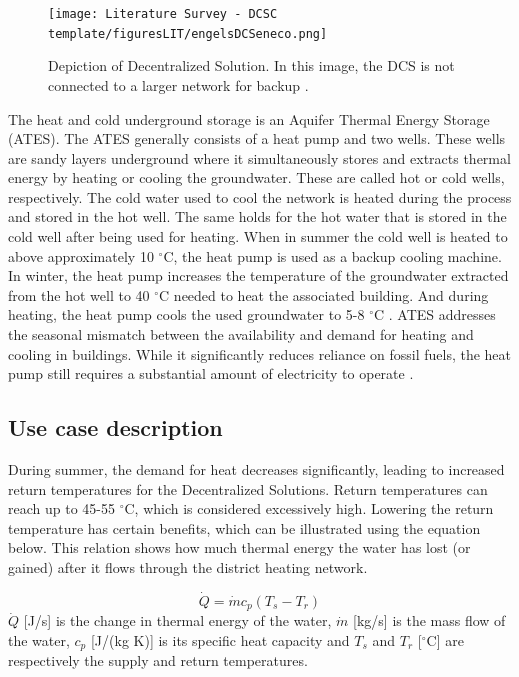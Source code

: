 \begin{figure}[h]
    \centering
    \texttt{[image: Literature Survey - DCSC template/figuresLIT/engelsDCSeneco.png]}
    \caption{Depiction of Decentralized Solution. In this image, the DCS is not connected to a larger network for backup \cite{DCSeneco}.}
    \label{fig:DCS}
\end{figure}
The heat and cold underground storage is an Aquifer Thermal Energy Storage (ATES). The ATES generally consists of a heat pump and two wells. These wells are sandy layers underground where it simultaneously stores and extracts thermal energy by heating or cooling the groundwater. These are called hot or cold wells, respectively. The cold water used to cool the network is heated during the process and stored in the hot well. The same holds for the hot water that is stored in the cold well after being used for heating. When in summer the cold well is heated to above approximately 10 $^{\circ}\text{C}$, the heat pump is used as a backup cooling machine. In winter, the heat pump increases the temperature of the groundwater extracted from the hot well to 40 $^{\circ}\text{C}$ needed to heat the associated building. And during heating, the heat pump cools the used groundwater to 5-8 $^{\circ}\text{C}$ \cite{bloemendal2018hidden}. ATES addresses the seasonal mismatch between the availability and demand for heating and cooling in buildings. While it significantly reduces reliance on fossil fuels, the heat pump still requires a substantial amount of electricity to operate \cite{tudelft_ates_triplet}.

\subsection{Use case description}
During summer, the demand for heat decreases significantly, leading to increased return temperatures for the Decentralized Solutions. Return temperatures can reach up to 45-55 $^{\circ}\text{C}$, which is considered excessively high. Lowering the return temperature has certain benefits, which can be illustrated using the equation below. This relation shows how much thermal energy the water has lost (or gained) after it flows through the district heating network. 

\begin{equation}\label{eq::overallheat}
    \dot{Q} = \dot{m} c_p (T_s - T_r)
\end{equation}
$\dot{Q}$ [J/s] is the change in thermal energy of the water, $\dot{m}$ [kg/s] is the mass flow of the water, $c_p$ [J/(kg K)] is its specific heat capacity and $T_s$ and $T_r$ [$^{\circ}\text{C}$] are respectively the supply and return temperatures. 


